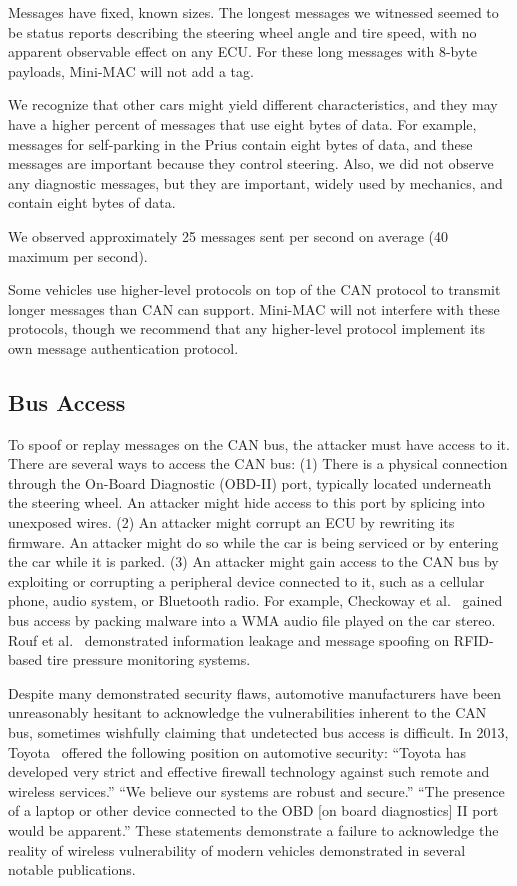 Messages have fixed, known sizes.  The longest messages we witnessed
seemed to be status reports describing the steering wheel angle and tire speed,
with no apparent observable effect on any ECU.
For these long messages with 8-byte payloads,  Mini-MAC will not add a tag. 

We recognize that other cars might yield different characteristics, and they may have a higher percent of
messages that use eight bytes of data.  For example, messages for
self-parking in the Prius contain eight bytes of data, and these messages are
important because they control steering. Also, we did not observe any diagnostic messages,
but they are important, widely used by mechanics, and contain eight bytes of data.

We observed approximately 25 messages sent per second on average (40 maximum per second).

Some vehicles use higher-level protocols on top of the 
CAN protocol to transmit longer messages than CAN can support. 
Mini-MAC will not interfere with these protocols, 
though we recommend that any higher-level 
protocol implement its own message authentication protocol.

\subsection{Bus Access}
\label{access}

To spoof or replay messages on the CAN bus, the attacker must have access to it.
There are several ways to access the CAN bus:  (1) There is a
physical connection through the On-Board Diagnostic (OBD-II) port, 
typically located underneath the steering wheel.  An attacker might hide
access to this port by splicing into unexposed wires.
(2) An attacker might corrupt an ECU by rewriting its firmware. An attacker might
do so while the car is being serviced or by entering the car while it is parked.
(3) An attacker might gain access to the CAN bus by exploiting or corrupting a peripheral
device connected to it, such as a cellular phone, audio system, or Bluetooth
radio.  For example, Checkoway et al.~\cite{Checkoway-2011} gained bus access by packing 
malware into a WMA audio file played on the car stereo. 
Rouf et al.~\cite{Rouf2010} demonstrated information leakage and message spoofing on RFID-based tire pressure monitoring systems.

Despite many demonstrated security flaws, automotive 
manufacturers have been unreasonably hesitant to acknowledge the vulnerabilities inherent to the CAN bus,
sometimes wishfully claiming that undetected bus access is difficult. 
In 2013, Toyota~\cite{bbc_toyota} offered the following position on automotive security: 
``Toyota has developed very strict and effective firewall technology against such remote and wireless services.'' 
``We believe our systems are robust and secure.'' 
``The presence of a laptop or other device connected to the OBD [on board diagnostics] II port would be apparent.'' 
These statements demonstrate a failure to acknowledge the 
reality of wireless vulnerability of modern vehicles demonstrated in several notable publications.

